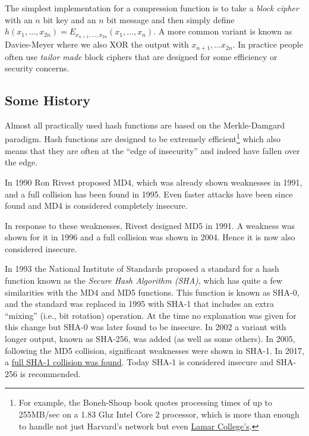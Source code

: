 The simplest implementation for a compression function is to take a
\emph{block cipher} with an \(n\) bit key and an \(n\) bit message and
then simply define
\(h(x_1,\ldots,x_{2n})=E_{x_{n+1},\ldots,x_{2n}}(x_{1},\ldots,x_{n})\).
A more common variant is known as Davies-Meyer where we also XOR the
output with \(x_{n+1},\ldots x_{2n}\). In practice people often use
\emph{tailor made} block ciphers that are designed for some efficiency
or security concerns.

\subsection{Some History}\label{7-Some-History}

Almost all practically used hash functions are based on the
Merkle-Damgard paradigm. Hash functions are designed to be extremely
efficient\footnote{For example, the Boneh-Shoup book quotes processing
  times of up to 255MB/sec on a 1.83 Ghz Intel Core 2 processor, which
  is more than enough to handle not just Harvard's network but even
  \href{http://www.huffingtonpost.com/2014/06/27/colleges-fastest-internet-speed-infographic_n_5536834.html}{Lamar
  College's}.} which also means that they are often at the ``edge of
insecurity'' and indeed have fallen over the edge.

In 1990 Ron Rivest proposed MD4, which was already shown weaknesses in
1991, and a full collision has been found in 1995. Even faster attacks
have been since found and MD4 is considered completely insecure.

In response to these weaknesses, Rivest designed MD5 in 1991. A weakness
was shown for it in 1996 and a full collision was shown in 2004. Hence
it is now also considered insecure.

In 1993 the National Institute of Standards proposed a standard for a
hash function known as the \emph{Secure Hash Algorithm (SHA)}, which has
quite a few similarities with the MD4 and MD5 functions. This function
is known as SHA-0, and the standard was replaced in 1995 with SHA-1 that
includes an extra ``mixing'' (i.e., bit rotation) operation. At the time
no explanation was given for this change but SHA-0 was later found to be
insecure. In 2002 a variant with longer output, known as SHA-256, was
added (as well as some others). In 2005, following the MD5 collision,
significant weaknesses were shown in SHA-1. In 2017, a
\href{https://goo.gl/jdqUX9}{full SHA-1 collision was found}. Today
SHA-1 is considered insecure and SHA-256 is recommended.

